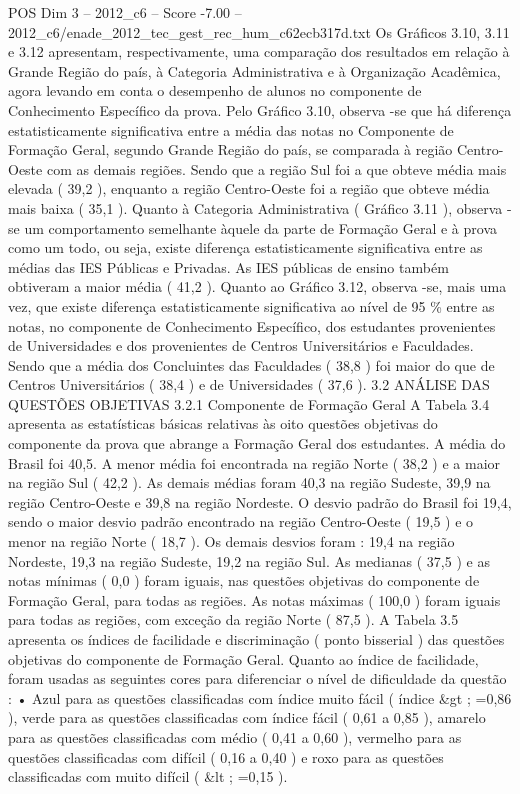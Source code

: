 \begin{textsample}{POS Dim 3 – 2012\_c6 – Score -7.00 – 2012\_c6/enade\_2012\_tec\_gest\_rec\_hum\_c62ecb317d.txt}
Os Gráficos 3.10, 3.11 e 3.12 apresentam, respectivamente, uma comparação dos resultados em relação à Grande Região do país, à Categoria Administrativa e à Organização Acadêmica, agora levando em conta o desempenho de alunos no componente de Conhecimento Específico da prova.
Pelo Gráfico 3.10, observa -se que há diferença estatisticamente significativa entre a média das notas no Componente de Formação Geral, segundo Grande Região do país, se comparada à região Centro-Oeste com as demais regiões.
Sendo que a região Sul foi a que obteve média mais elevada ( 39,2 ), enquanto a região Centro-Oeste foi a região que obteve média mais baixa ( 35,1 ).
Quanto à Categoria Administrativa ( Gráfico 3.11 ), observa -se um comportamento semelhante àquele da parte de Formação Geral e à prova como um todo, ou seja, existe diferença estatisticamente significativa entre as médias das IES Públicas e Privadas.
As IES públicas de ensino também obtiveram a maior média ( 41,2 ).
Quanto ao Gráfico 3.12, observa -se, mais uma vez, que existe diferença estatisticamente significativa ao nível de 95 \% entre as notas, no componente de Conhecimento Específico, dos estudantes provenientes de Universidades e dos provenientes de Centros Universitários e Faculdades.
Sendo que a média dos Concluintes das Faculdades ( 38,8 ) foi maior do que de Centros Universitários ( 38,4 ) e de Universidades ( 37,6 ). 3.2 ANÁLISE DAS QUESTÕES OBJETIVAS 3.2.1 Componente de Formação Geral A Tabela 3.4 apresenta as estatísticas básicas relativas às oito questões objetivas do componente da prova que abrange a Formação Geral dos estudantes.
A média do Brasil foi 40,5.
A menor média foi encontrada na região Norte ( 38,2 ) e a maior na região Sul ( 42,2 ).
As demais médias foram 40,3 na região Sudeste, 39,9 na região Centro-Oeste e 39,8 na região Nordeste.
O desvio padrão do Brasil foi 19,4, sendo o maior desvio padrão encontrado na região Centro-Oeste ( 19,5 ) e o menor na região Norte ( 18,7 ).
Os demais desvios foram : 19,4 na região Nordeste, 19,3 na região Sudeste, 19,2 na região Sul.
As medianas ( 37,5 ) e as notas mínimas ( 0,0 ) foram iguais, nas questões objetivas do componente de Formação Geral, para todas as regiões.
As notas máximas ( 100,0 ) foram iguais para todas as regiões, com exceção da região Norte ( 87,5 ).
A Tabela 3.5 apresenta os índices de facilidade e discriminação ( ponto bisserial ) das questões objetivas do componente de Formação Geral.
Quanto ao índice de facilidade, foram usadas as seguintes cores para diferenciar o nível de dificuldade da questão : • Azul para as questões classificadas com índice muito fácil ( índice \&gt ; =0,86 ), verde para as questões classificadas com índice fácil ( 0,61 a 0,85 ), amarelo para as questões classificadas com médio ( 0,41 a 0,60 ), vermelho para as questões classificadas com difícil ( 0,16 a 0,40 ) e roxo para as questões classificadas com muito difícil ( \&lt ; =0,15 ).

\end{textsample}
